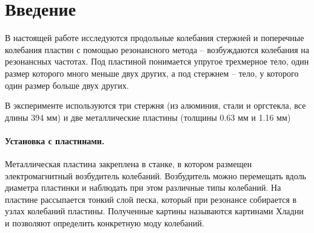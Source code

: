 \def\labauthors{Карусевич А.А., Понур К.А.}
\def\labgroup{440}
\def\labnumber{1}
\def\labtheme{Колебания механических систем \\[0.2em] с распределенными параметрами}
\def\shortlabtheme{Колебания пластин и стержней}
\def\department{Кафедра акустики}



\tableofcontents
\newpage


\section*{Введение}
\vspace{-0.5em}
В настоящей работе исследуются продольные колебания стержней и поперечные колебания пластин с помощью резонансного метода -- возбуждаются колебания на резонансных частотах. Под пластиной понимается упругое трехмерное тело, один размер которого много меньше двух других, а под стержнем -- тело, у которого один размер больше двух других. 

В эксперименте используются три стержня (из алюминия, стали и оргстекла, все длины 394 мм) и две металлические пластины (толщины 0.63 мм и 1.16 мм)
\vspace{-0.5em}




\paragraph{Установка с пластинами.} Металлическая пластина закреплена в станке, в котором размещен электромагнитный возбудитель колебаний. Возбудитель можно перемещать вдоль диаметра пластинки и наблюдать при этом различные типы колебаний. На пластине рассыпается тонкий слой песка, который при резонансе собирается в узлах колебаний пластины. Полученные картины называются картинами Хладни и позволяют определить конкретную моду колебаний.


\newpage

